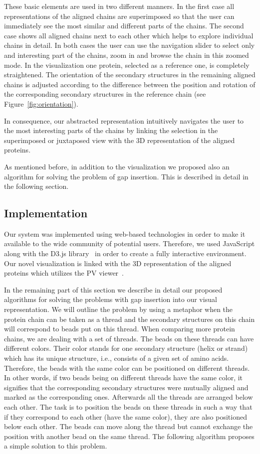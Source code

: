 \documentclass[twocolumn]{bmcart}%
\begin{document}
These basic elements are used in two different manners.
In the first case all representations of the aligned chains are superimposed so that the user can immediately see the most similar and different parts of the chains.
The second case shows all aligned chains next to each other which helps to explore individual chains in detail.
In both cases the user can use the navigation slider to select only and interesting part of the chains, zoom in and browse the chain in this zoomed mode.
In the visualization one protein, selected as a reference one, is completely straightened.
The orientation of the secondary structures in the remaining aligned chains is adjusted according to the difference between the position and rotation of the corresponding secondary structures in the reference chain (see Figure~\ref{fig:orientation}).

In consequence, our abstracted representation intuitively navigates the user to the most interesting parts of the chains by linking the selection in the superimposed or juxtaposed view with the 3D representation of the aligned proteins. 

As mentioned before, in addition to the visualization we proposed also an algorithm for solving the problem of gap insertion.
This is described in detail in the following section.


\subsection*{Implementation}
Our system was implemented using web-based technologies in order to make it available to the wide community of potential users.
Therefore, we used JavaScript along with the D3.js library~\cite{d3} in order to create a fully interactive environment.
Our novel visualization is linked with the 3D representation of the aligned proteins which utilizes the PV viewer~\cite{biasini2014}. 

In the remaining part of this section we describe in detail our proposed algorithms for solving the problems with gap insertion into our visual representation.
We will outline the problem by using a metaphor when the protein chain can be taken as a thread and the secondary structures on this chain will correspond to beads put on this thread.
When comparing more protein chains, we are dealing with a set of threads. 
The beads on these threads can have different colors. 
Their color stands for one secondary structure (helix or strand) which has its unique structure, i.e., consists of a given set of amino acids.
Therefore, the beads with the same color can be positioned on different threads.
In other words, if two beads being on different threads have the same color, it signifies that the corresponding secondary structures were mutually aligned and marked as the corresponding ones. 
Afterwards all the threads are arranged below each other.
The task is to position the beads on these threads in such a way that if they correspond to each other (have the same color), they are also positioned below each other. 
The beads can move along the thread but cannot exchange the position with another bead on the same thread.
The following algorithm proposes a simple solution to this problem.
\end{document}
